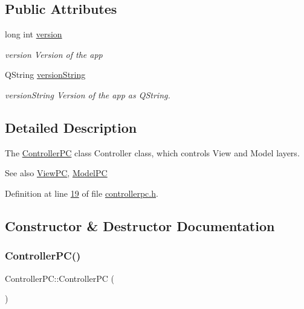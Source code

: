\subsection*{Public Attributes}
\begin{DoxyCompactItemize}
\item 
long int \mbox{\hyperlink{class_controller_p_c_a9eb43c34237d66751a6411e55cf5f55e}{version}}
\begin{DoxyCompactList}\small\item\em version Version of the app \end{DoxyCompactList}\item 
Q\+String \mbox{\hyperlink{class_controller_p_c_a0e63cca37d6ce2e660f3380400c2c5f3}{version\+String}}
\begin{DoxyCompactList}\small\item\em version\+String Version of the app as Q\+String. \end{DoxyCompactList}\end{DoxyCompactItemize}


\subsection{Detailed Description}
The \mbox{\hyperlink{class_controller_p_c}{Controller\+PC}} class Controller class, which controls View and Model layers. 

\begin{DoxySeeAlso}{See also}
\mbox{\hyperlink{class_view_p_c}{View\+PC}}, \mbox{\hyperlink{class_model_p_c}{Model\+PC}} 
\end{DoxySeeAlso}


Definition at line \mbox{\hyperlink{controllerpc_8h_source_l00019}{19}} of file \mbox{\hyperlink{controllerpc_8h_source}{controllerpc.\+h}}.



\subsection{Constructor \& Destructor Documentation}
\mbox{\label{class_controller_p_c_afa6c92d67bf3b6531c42385fc5938003}} 
\subsubsection{\texorpdfstring{Controller\+P\+C()}{ControllerPC()}}
{\footnotesize\ttfamily Controller\+P\+C\+::\+Controller\+PC (\begin{DoxyParamCaption}{ }\end{DoxyParamCaption})}



